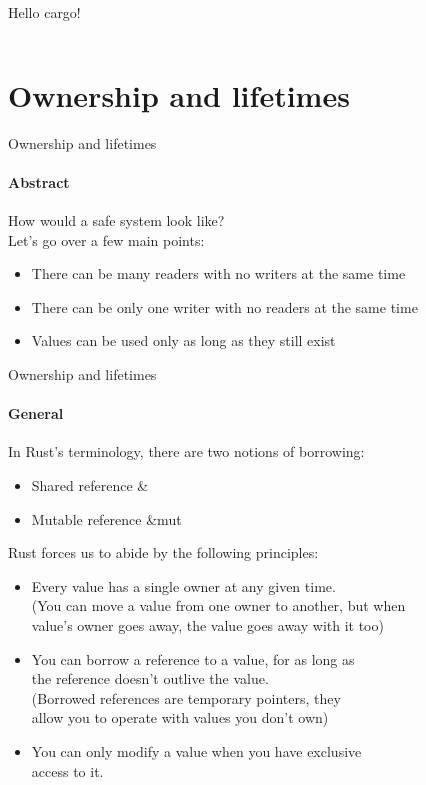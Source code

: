 \documentclass[usenames,dvipsnames,10pt,aspectratio=169]{beamer}
\begin{document}
\begin{frame}{Hello cargo!}
	\inputminted[fontsize=\Large]{bash}{code/hellocargo.sh}
\end{frame}


\section{Ownership and lifetimes}
\begin{frame}{Ownership and lifetimes}
	\framesubtitle{Abstract}
	\large
	How would a safe system look like?\\
	\vspace{0.4cm}
	Let's go over a few main points:\\
	\vspace{0.4cm}
	\begin{itemize}[label=$\bullet$]
		\item There can be many readers with no writers at the same time
		\item There can be only one writer with no readers at the same time
		\item Values can be used only as long as they still exist
	\end{itemize}
\end{frame}

\begin{frame}{Ownership and lifetimes}
	\framesubtitle{General}
	\large
	In Rust's terminology, there are two notions of borrowing:
	\begin{itemize}[label=$\bullet$]
		\item Shared reference \textcolor{ucuyellow}{\&}
		\item Mutable reference \textcolor{ucuyellow}{\&mut}
	\end{itemize}

	\vspace{0.5cm}
	Rust forces us to abide by the following principles:
	\begin{itemize}[label=$\bullet$]
		\item Every value has a single owner at any given time.\\
			(You can move a value from one owner to another, but when\\
			value's owner goes away, the value goes away with it too)
		\item You can borrow a reference to a value, for as long as\\
			the reference doesn't outlive the value.\\
			(Borrowed references are temporary pointers, they\\
			allow you to operate with values you don't own)
		\item You can only modify a value when you have exclusive\\
			access to it.
	\end{itemize}
	\vspace{0.5cm}
\end{frame}
\end{document}
